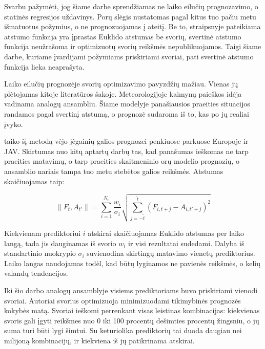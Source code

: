 \documentclass[]{VUMIFTemplateClass}
\begin{document}
    Svarbu pažymėti, jog šiame darbe sprendžiamas ne laiko eilučių prognozavimo, o statinės regresijos uždavinys.
    Porų slėgis nustatomas pagal kitus tuo pačiu metu išmatuotus požymius, o ne prognozuojamas į ateitį.
    Be to, straipsnyje pateikiama atstumo funkcija yra įprastas Euklido atstumas be svorių, svertinė atstumo funkcija neužrašoma ir optimizuotų svorių reikšmės nepublikuojamos.
    Taigi šiame darbe, kuriame įvardijami požymiams priskiriami svoriai, pati svertinė atstumo funkcija lieka neaprašyta.

    Laiko eilučių prognozėje svorių optimizavimo pavyzdžių mažiau.
    Vienas jų plėtojamas kitoje literatūros šakoje.
    Meteorologijoje kaimynų paieškos idėja vadinama analogų ansambliu.
    Šiame modelyje panašiausios praeities situacijos randamos pagal svertinį atstumą, o prognozė sudaroma iš to, kas po jų realiai įvyko.

    \cite{junk2015} taiko šį metodą vėjo jėgainių galios prognozei penkiuose parkuose Europoje ir JAV.
    Skirtumas nuo kitų aptartų darbų tas, kad panašumas ieškomas ne tarp praeities matavimų, o tarp praeities skaitmeninio orų modelio prognozių, o ansamblio nariais tampa tuo metu stebėtos galios reikšmės.
    Atstumas skaičiuojamas taip:

    \begin{equation}
        \|F_t, A_{t'}\| = \sum_{i=1}^{N_v} \frac{w_i}{\sigma_i}
        \sqrt{\sum_{j=-\tilde t}^{\tilde t} \left( F_{i,t+j} - A_{i,t'+j} \right)^2}
        \label{eq:junk-atstumas}
    \end{equation}

    Kiekvienam prediktoriui $i$ atskirai skaičiuojamas Euklido atstumas per laiko langą, tada jis dauginamas iš svorio $w_i$ ir visi rezultatai sudedami.
    Dalyba iš standartinio nuokrypio $\sigma_i$ suvienodina skirtingų matavimo vienetų prediktorius.
    Laiko langas naudojamas todėl, kad būtų lyginamos ne pavienės reikšmės, o kelių valandų tendencijos.

    Iki šio darbo analogų ansamblyje visiems prediktoriams buvo priskiriami vienodi svoriai.
    Autoriai svorius optimizuoja minimizuodami tikimybinės prognozės kokybės matą.
    Svoriai ieškomi perrenkant visas leistinas kombinacijas: kiekvienas svoris gali įgyti reikšmes nuo 0 iki 100 procentų dešimties procentų žingsniu, o jų suma turi būti lygi šimtui.
    Su keturiolika prediktorių tai duoda daugiau nei milijoną kombinacijų, ir kiekviena iš jų patikrinama atskirai.
\end{document}
